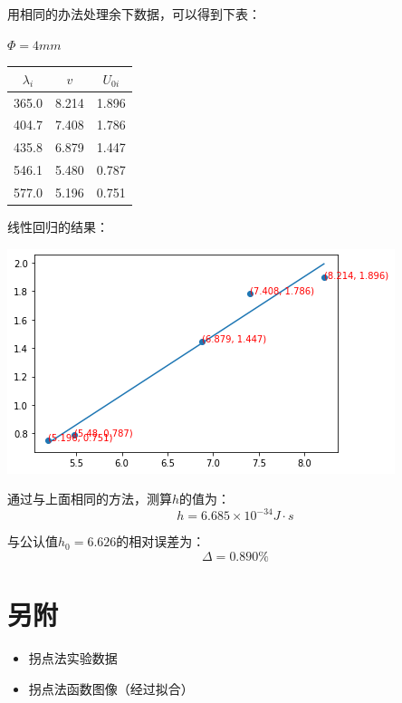 \documentclass[a4paper]{ltxdoc}
\newenvironment{Figure}
  {\par\medskip\noindent\minipage{\linewidth}}
  {\endminipage\par\medskip}
\begin{document}
\begin{multicols}{2}
\begin{itemize}
              \bigskip
              用相同的办法处理余下数据，可以得到下表：

              \begin{Figure}
                  \centering
                  $\Phi = 4 mm$

                  \smallskip
                  \begin{tabular}{|c|c|c|}
                      \hline $\lambda _i$ & $v$   & $U_{0i}$ \\
                      \hline 365.0        & 8.214 & 1.896    \\
                      \hline 404.7        & 7.408 & 1.786    \\
                      \hline 435.8        & 6.879 & 1.447    \\
                      \hline 546.1        & 5.480 & 0.787    \\
                      \hline 577.0        & 5.196 & 0.751    \\ \hline
                  \end{tabular}
              \end{Figure}

              线性回归的结果：
              \begin{Figure}
                  \centering
                  \includegraphics[width=\linewidth]{img/12.png}
              \end{Figure}

              通过与上面相同的方法，测算$h$的值为：
              $$
                  h = 6.685 \times 10^{-34} J \cdot s
              $$

              与公认值$h_0 = 6.626$的相对误差为：
              $$
                  \Delta = 0.890\%
              $$
    \end{itemize}

    \section{另附}
    \begin{itemize}
        \item 拐点法实验数据
        \item 拐点法函数图像（经过拟合）
    \end{itemize}
\end{multicols}
\newpage
\end{document}
